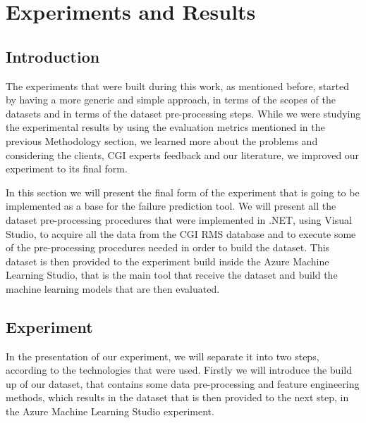 


\chapter{Experiments and Results}
\label{cha:Experiments and Results}


\section{Introduction}
\label{sub:if_you_use_this_template} 
The experiments that were built during this work, as mentioned before, started by having a more generic and simple approach, in terms of the scopes of the datasets and in terms of the dataset pre-processing steps. While we were studying the experimental results by using the evaluation metrics mentioned in the previous Methodology section, we learned more about the problems and considering the clients, CGI experts feedback and our literature, we improved our experiment to its final form.

In this section we will present the final form of the experiment that is going to be implemented as a base for the failure prediction tool. We will present all the dataset pre-processing procedures that were implemented in .NET, using Visual Studio, to acquire all the data from the CGI RMS database and to execute some of the pre-processing procedures needed in order to build the dataset. This dataset is then provided to the experiment build inside the Azure Machine Learning Studio, that is the main tool that receive the dataset and build the machine learning models that are then evaluated.

\section{Experiment}
In the presentation of our experiment, we will separate it into two steps, according to the technologies that were used. Firstly we will introduce the build up of our dataset, that contains some data pre-processing and feature engineering methods, which results in the dataset that is then provided to the next step, in the Azure Machine Learning Studio experiment.

